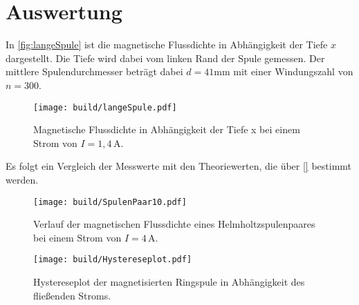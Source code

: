 \section{Auswertung}
\label{sec:Auswertung}

In \autoref{fig:langeSpule} ist die magnetische Flussdichte in Abhängigkeit der Tiefe $x$ dargestellt. Die Tiefe
wird dabei vom linken Rand der Spule gemessen. Der mittlere Spulendurchmesser beträgt dabei $d=41 \unit{\milli\meter}$
mit einer Windungszahl von $n=300$.
\begin{figure}[H]
    \centering
    \texttt{[image: build/langeSpule.pdf]}
    \caption{Magnetische Flussdichte in Abhängigkeit der Tiefe x bei einem Strom von $I= 1,4 \, \unit{\ampere}$.}
    \label{fig:langeSpule}
  \end{figure}


Es folgt ein Vergleich der Messwerte mit den Theoriewerten, die über \eqref{} bestimmt werden.


  \begin{figure}[H]
    \centering
    \texttt{[image: build/SpulenPaar10.pdf]}
    \caption{Verlauf der magnetischen Flussdichte eines Helmholtzspulenpaares bei einem Strom von $I= 4 \, \unit{\ampere}$.}
    \label{fig:SpulenPaar10}
  \end{figure}


\begin{figure}[H]
    \centering
    \texttt{[image: build/Hystereseplot.pdf]}
    \caption{Hystereseplot der magnetisierten Ringspule in Abhängigkeit des fließenden Stroms.}
    \label{fig:Hystereseplot}
  \end{figure}
